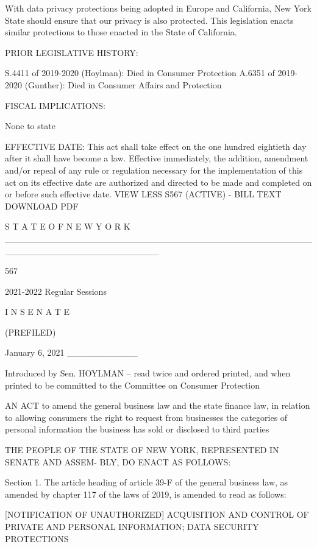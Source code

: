 With data privacy protections being adopted in Europe and California,
New York State should ensure that our privacy is also protected. This
legislation enacts similar protections to those enacted in the State of
California.

 
PRIOR LEGISLATIVE HISTORY:

S.4411 of 2019-2020 (Hoylman): Died in Consumer Protection
A.6351 of 2019-2020 (Gunther): Died in Consumer Affairs and Protection

 
FISCAL IMPLICATIONS:

None to state

 
EFFECTIVE DATE:
This act shall take effect on the one hundred eightieth day after it
shall have become a law. Effective immediately, the addition, amendment
and/or repeal of any rule or regulation necessary for the implementation
of this act on its effective date are authorized and directed to be made
and completed on or before such effective date.
VIEW LESS
S567 (ACTIVE) - BILL TEXT
DOWNLOAD PDF
 
                     S T A T E   O F   N E W   Y O R K
 ________________________________________________________________________
 
                                    567
 
                        2021-2022 Regular Sessions
 
                             I N  S E N A T E
 
                                (PREFILED)
 
                              January 6, 2021
                                ___________
 
 Introduced  by  Sen. HOYLMAN -- read twice and ordered printed, and when
   printed to be committed to the Committee on Consumer Protection
 
 AN ACT to amend the general business law and the state finance  law,  in
   relation  to  allowing  consumers the right to request from businesses
   the categories of  personal  information  the  business  has  sold  or
   disclosed to third parties
 
   THE  PEOPLE OF THE STATE OF NEW YORK, REPRESENTED IN SENATE AND ASSEM-
 BLY, DO ENACT AS FOLLOWS:
 
   Section 1. The article heading of article 39-F of the general business
 law, as amended by chapter 117 of the laws of 2019, is amended  to  read
 as follows:
 
          [NOTIFICATION OF UNAUTHORIZED] ACQUISITION AND CONTROL
            OF PRIVATE AND PERSONAL INFORMATION; DATA SECURITY
                                PROTECTIONS
 
